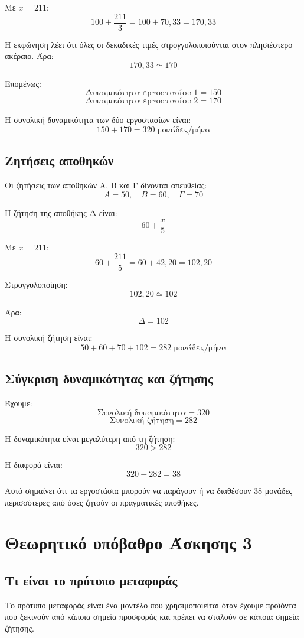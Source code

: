 \documentclass[12pt,a4paper]{article}
\begin{document}
Με \(x=211\):
\[
100+\frac{211}{3}=100+70{,}33=170{,}33
\]

Η εκφώνηση λέει ότι όλες οι δεκαδικές τιμές στρογγυλοποιούνται στον πλησιέστερο ακέραιο. Άρα:
\[
170{,}33 \simeq 170
\]

Επομένως:
\[
\boxed{\text{Δυναμικότητα εργοστασίου 1}=150}
\]
\[
\boxed{\text{Δυναμικότητα εργοστασίου 2}=170}
\]

Η συνολική δυναμικότητα των δύο εργοστασίων είναι:
\[
150+170=320 \text{ μονάδες/μήνα}
\]

\subsection{Ζητήσεις αποθηκών}

Οι ζητήσεις των αποθηκών Α, Β και Γ δίνονται απευθείας:
\[
A=50,\quad B=60,\quad \Gamma=70
\]

Η ζήτηση της αποθήκης Δ είναι:
\[
60+\frac{x}{5}
\]

Με \(x=211\):
\[
60+\frac{211}{5}=60+42{,}20=102{,}20
\]

Στρογγυλοποίηση:
\[
102{,}20 \simeq 102
\]

Άρα:
\[
\boxed{\Delta=102}
\]

Η συνολική ζήτηση είναι:
\[
50+60+70+102=282 \text{ μονάδες/μήνα}
\]

\subsection{Σύγκριση δυναμικότητας και ζήτησης}

Έχουμε:
\[
\text{Συνολική δυναμικότητα}=320
\]
\[
\text{Συνολική ζήτηση}=282
\]

Η δυναμικότητα είναι μεγαλύτερη από τη ζήτηση:
\[
320>282
\]

Η διαφορά είναι:
\[
320-282=38
\]

Αυτό σημαίνει ότι τα εργοστάσια μπορούν να παράγουν ή να διαθέσουν 38 μονάδες περισσότερες από όσες ζητούν οι πραγματικές αποθήκες.

\section{Θεωρητικό υπόβαθρο Άσκησης 3}

\subsection{Τι είναι το πρότυπο μεταφοράς}

Το πρότυπο μεταφοράς είναι ένα μοντέλο που χρησιμοποιείται όταν έχουμε προϊόντα που ξεκινούν από κάποια σημεία προσφοράς και πρέπει να σταλούν σε κάποια σημεία ζήτησης.
\end{document}
